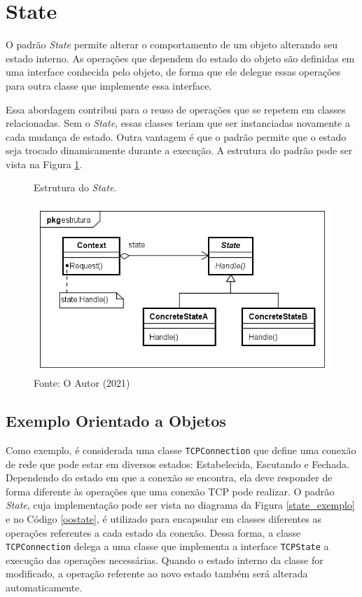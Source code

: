 \section{State}

O padrão \textit{State} permite alterar o comportamento de um objeto 
alterando seu estado interno. As operações que dependem do 
estado do objeto são definidas em uma interface conhecida 
pelo objeto, de forma que ele delegue essas operações 
para outra classe que implemente essa interface.\cite{gamma:1995} 

Essa abordagem contribui para o reuso de operações 
que se repetem em classes relacionadas. Sem o \textit{State}, 
essas classes teriam que ser instanciadas novamente 
a cada mudança de estado. Outra vantagem é que o 
padrão permite que o estado seja trocado dinamicamente 
durante a execução. A estrutura do padrão pode ser 
vista na Figura \ref{state_struct}.

\begin{figure}[htb]
	\caption{\label{state_struct}Estrutura do \textit{State}.}
	\begin{center}
	    \includegraphics[scale=0.5]{5_padroes-contexto-funcional/5.3_comportamentais/5.3.08_state/state_estrutura.png}
	\end{center}
  \caption*{Fonte: O Autor (2021)}
\end{figure}

\subsection*{Exemplo Orientado a Objetos}

Como exemplo, é considerada uma classe \texttt{TCPConnection} 
que define uma conexão de rede que pode estar em diversos 
estados: Estabelecida, Escutando e Fechada. Dependendo 
do estado em que a conexão se encontra, ela deve 
responder de forma diferente às operações que uma 
conexão TCP pode realizar. O padrão \textit{State}, cuja 
implementação pode ser vista no diagrama da Figura 
\ref{state_exemplo} e no Código \ref{oostate}, é 
utilizado para encapsular em classes diferentes as 
operações referentes a cada estado da conexão. 
Dessa forma, a classe \texttt{TCPConnection} delega a uma classe 
que implementa a interface \texttt{TCPState} a execução das 
operações necessárias. Quando o estado interno da classe 
for modificado, a operação referente ao novo estado 
também será alterada automaticamente.

